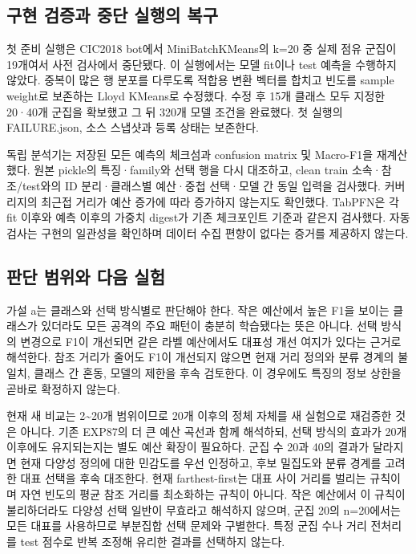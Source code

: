 \subsection{구현 검증과 중단 실행의 복구}
첫 준비 실행은 CIC2018 bot에서 MiniBatchKMeans의 k=\allowbreak{}20 중 실제 점유 군집이 19개여서 사전 검사에서 중단됐다. 이 실행에서는 모델 fit이나 test 예측을 수행하지 않았다. 중복이 많은 행 분포를 다루도록 적합용 변환 벡터를 합치고 빈도를 sample weight로 보존하는 Lloyd KMeans로 수정했다. 수정 후 15개 클래스 모두 지정한 20·40개 군집을 확보했고 그 뒤 320개 모델 조건을 완료했다. 첫 실행의 FAILURE.json, 소스 스냅샷과 등록 상태는 보존한다.

독립 분석기는 저장된 모든 예측의 체크섬과 confusion matrix 및 Macro-F1을 재계산했다. 원본 pickle의 특징·family와 선택 행을 다시 대조하고, clean train 소속·참조/\allowbreak{}test와의 ID 분리·클래스별 예산·중첩 선택·모델 간 동일 입력을 검사했다. 커버리지의 최근접 거리가 예산 증가에 따라 증가하지 않는지도 확인했다. TabPFN은 각 fit 이후와 예측 이후의 가중치 digest가 기존 체크포인트 기준과 같은지 검사했다. 자동 검사는 구현의 일관성을 확인하며 데이터 수집 편향이 없다는 증거를 제공하지 않는다.

\subsection{판단 범위와 다음 실험}
가설 a는 클래스와 선택 방식별로 판단해야 한다. 작은 예산에서 높은 F1을 보이는 클래스가 있더라도 모든 공격의 주요 패턴이 충분히 학습됐다는 뜻은 아니다. 선택 방식의 변경으로 F1이 개선되면 같은 라벨 예산에서도 대표성 개선 여지가 있다는 근거로 해석한다. 참조 거리가 줄어도 F1이 개선되지 않으면 현재 거리 정의와 분류 경계의 불일치, 클래스 간 혼동, 모델의 제한을 후속 검토한다. 이 경우에도 특징의 정보 상한을 곧바로 확정하지 않는다.

현재 새 비교는 2\textasciitilde{}20개 범위이므로 20개 이후의 정체 자체를 새 실험으로 재검증한 것은 아니다. 기존 EXP87의 더 큰 예산 곡선과 함께 해석하되, 선택 방식의 효과가 20개 이후에도 유지되는지는 별도 예산 확장이 필요하다. 군집 수 20과 40의 결과가 달라지면 현재 다양성 정의에 대한 민감도를 우선 인정하고, 후보 밀집도와 분류 경계를 고려한 대표 선택을 후속 대조한다. 현재 farthest-first는 대표 사이 거리를 벌리는 규칙이며 자연 빈도의 평균 참조 거리를 최소화하는 규칙이 아니다. 작은 예산에서 이 규칙이 불리하더라도 다양성 선택 일반이 무효라고 해석하지 않으며, 군집 20의 n=\allowbreak{}20에서는 모든 대표를 사용하므로 부분집합 선택 문제와 구별한다. 특정 군집 수나 거리 전처리를 test 점수로 반복 조정해 유리한 결과를 선택하지 않는다.


